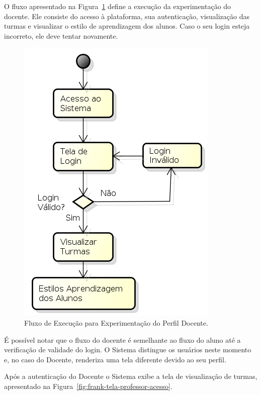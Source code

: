 O fluxo apresentado na Figura~\ref{fig:fluxo-aluno} define a execução da experimentação do docente. Ele consiste do acesso à plataforma, sua autenticação, visualização das turmas e visualizar o estilo de aprendizagem dos alunos. Caso o seu login esteja incorreto, ele deve tentar novamente.

\begin{figure}
	\centering
	\includegraphics[scale=0.6]{images/fluxo-docente.png}
	\caption{Fluxo de Execução para Experimentação do Perfil Docente.}
	\label{fig:fluxo-aluno}
\end{figure}

É possível notar que o fluxo do docente é semelhante ao fluxo do aluno até a verificação de validade do login. O Sistema distingue os usuários neste momento e, no caso do Docente, renderiza uma tela diferente devido ao seu perfil. 

Após a autenticação do Docente o Sistema exibe a tela de visualização de turmas, apresentado na Figura~\ref{fig:frank-tela-professor-acesso}.

